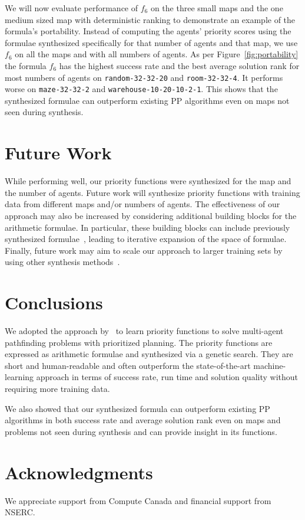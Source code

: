 We will now evaluate performance of $ f_{6} $ on the three small maps and the one medium sized map with deterministic ranking to demonstrate an example of the formula's portability. Instead of computing the agents' priority scores using the formulae synthesized specifically for that number of agents and that map, we use $ f_6 $ on all the maps and with all numbers of agents. As per Figure~\ref{fig:portability} the formula $ f_6 $ has the highest success rate and the best average solution rank for most numbers of agents on {\tt random-32-32-20} and {\tt room-32-32-4}. It performs worse on {\tt maze-32-32-2} and {\tt warehouse-10-20-10-2-1}. This shows that the synthesized formulae can outperform existing PP algorithms even on maps not seen during synthesis.

\section{Future Work}

While performing well, our priority functions were synthesized for the map and the number of agents. Future work will synthesize priority functions with training data from different maps and/or numbers of agents. The effectiveness of our approach may also be increased by considering additional building blocks for the arithmetic formulae. In particular, these building blocks can include previously synthesized formulae~\cite{bulitko2022portability}, leading to iterative expansion of the space of formulae. Finally, future work may aim to scale our approach to larger training sets by using other synthesis methods~\citep{shah2022near,mapElites,Gallotta_2022,FI2Pop}.

\section{Conclusions}
\label{sec:conclusions}

We adopted the approach by~\citet{bulitko2022portability} to learn priority functions to solve multi-agent pathfinding problems with prioritized planning. The priority functions are expressed as arithmetic formulae and synthesized via a genetic search. They are short and human-readable and often outperform the state-of-the-art machine-learning approach in terms of success rate, run time and solution quality without requiring more training data.

We also showed that our synthesized formula can outperform existing PP algorithms in both success rate and average solution rank even on maps and problems not seen during synthesis and can provide insight in its functions.

\section*{Acknowledgments}

We appreciate support from Compute Canada and financial support from NSERC.

\clearpage



